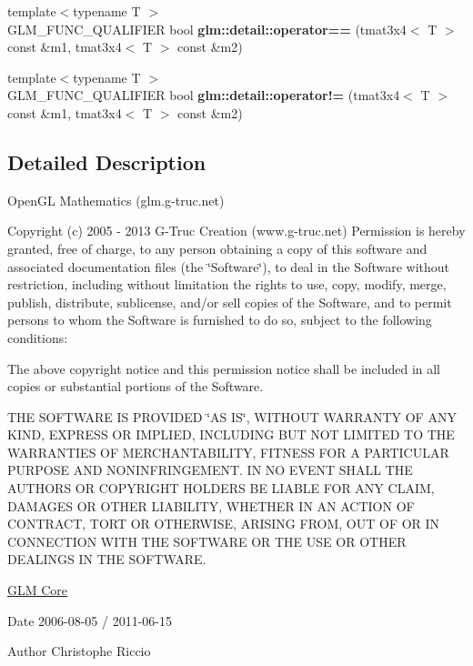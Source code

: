 \begin{DoxyCompactItemize}
\item 
\hypertarget{namespaceglm_1_1detail_ac9dfe3a4276deb126dead3fe196bb81d}{}{\footnotesize template$<$typename T $>$ }\\G\+L\+M\+\_\+\+F\+U\+N\+C\+\_\+\+Q\+U\+A\+L\+I\+F\+I\+E\+R bool {\bfseries glm\+::detail\+::operator==} (tmat3x4$<$ T $>$ const \&m1, tmat3x4$<$ T $>$ const \&m2)\label{namespaceglm_1_1detail_ac9dfe3a4276deb126dead3fe196bb81d}

\item 
\hypertarget{namespaceglm_1_1detail_a06bb5a617c042f5240f6100cedb38cdb}{}{\footnotesize template$<$typename T $>$ }\\G\+L\+M\+\_\+\+F\+U\+N\+C\+\_\+\+Q\+U\+A\+L\+I\+F\+I\+E\+R bool {\bfseries glm\+::detail\+::operator!=} (tmat3x4$<$ T $>$ const \&m1, tmat3x4$<$ T $>$ const \&m2)\label{namespaceglm_1_1detail_a06bb5a617c042f5240f6100cedb38cdb}

\end{DoxyCompactItemize}


\subsection{Detailed Description}
Open\+G\+L Mathematics (glm.\+g-\/truc.\+net)

Copyright (c) 2005 -\/ 2013 G-\/\+Truc Creation (www.\+g-\/truc.\+net) Permission is hereby granted, free of charge, to any person obtaining a copy of this software and associated documentation files (the \char`\"{}\+Software\char`\"{}), to deal in the Software without restriction, including without limitation the rights to use, copy, modify, merge, publish, distribute, sublicense, and/or sell copies of the Software, and to permit persons to whom the Software is furnished to do so, subject to the following conditions\+:

The above copyright notice and this permission notice shall be included in all copies or substantial portions of the Software.

T\+H\+E S\+O\+F\+T\+W\+A\+R\+E I\+S P\+R\+O\+V\+I\+D\+E\+D \char`\"{}\+A\+S I\+S\char`\"{}, W\+I\+T\+H\+O\+U\+T W\+A\+R\+R\+A\+N\+T\+Y O\+F A\+N\+Y K\+I\+N\+D, E\+X\+P\+R\+E\+S\+S O\+R I\+M\+P\+L\+I\+E\+D, I\+N\+C\+L\+U\+D\+I\+N\+G B\+U\+T N\+O\+T L\+I\+M\+I\+T\+E\+D T\+O T\+H\+E W\+A\+R\+R\+A\+N\+T\+I\+E\+S O\+F M\+E\+R\+C\+H\+A\+N\+T\+A\+B\+I\+L\+I\+T\+Y, F\+I\+T\+N\+E\+S\+S F\+O\+R A P\+A\+R\+T\+I\+C\+U\+L\+A\+R P\+U\+R\+P\+O\+S\+E A\+N\+D N\+O\+N\+I\+N\+F\+R\+I\+N\+G\+E\+M\+E\+N\+T. I\+N N\+O E\+V\+E\+N\+T S\+H\+A\+L\+L T\+H\+E A\+U\+T\+H\+O\+R\+S O\+R C\+O\+P\+Y\+R\+I\+G\+H\+T H\+O\+L\+D\+E\+R\+S B\+E L\+I\+A\+B\+L\+E F\+O\+R A\+N\+Y C\+L\+A\+I\+M, D\+A\+M\+A\+G\+E\+S O\+R O\+T\+H\+E\+R L\+I\+A\+B\+I\+L\+I\+T\+Y, W\+H\+E\+T\+H\+E\+R I\+N A\+N A\+C\+T\+I\+O\+N O\+F C\+O\+N\+T\+R\+A\+C\+T, T\+O\+R\+T O\+R O\+T\+H\+E\+R\+W\+I\+S\+E, A\+R\+I\+S\+I\+N\+G F\+R\+O\+M, O\+U\+T O\+F O\+R I\+N C\+O\+N\+N\+E\+C\+T\+I\+O\+N W\+I\+T\+H T\+H\+E S\+O\+F\+T\+W\+A\+R\+E O\+R T\+H\+E U\+S\+E O\+R O\+T\+H\+E\+R D\+E\+A\+L\+I\+N\+G\+S I\+N T\+H\+E S\+O\+F\+T\+W\+A\+R\+E.

\hyperlink{group__core}{G\+L\+M Core}

\begin{DoxyDate}{Date}
2006-\/08-\/05 / 2011-\/06-\/15 
\end{DoxyDate}
\begin{DoxyAuthor}{Author}
Christophe Riccio 
\end{DoxyAuthor}
